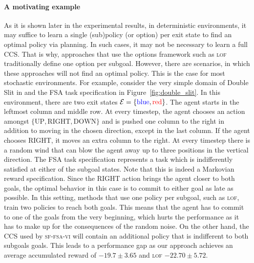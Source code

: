 \paragraph{A motivating example} As it is shown later in the experimental results, in deterministic environments, it may suffice to learn a single (sub)policy (or option) per exit state to find an optimal policy via planning. In such cases, it may not be necessary to learn a full CCS. That is why, approaches that use the options framework such as \textsc{lof} traditionally define one option per subgoal. However, there are scenarios, in which these approaches will not find an optimal policy. This is the case for most stochastic environments. For example, consider the very simple domain of Double Slit in and the FSA task specification in Figure~\ref{fig:double_slit}. In this environment, there are two exit states $\mathcal{E}=\{{\color{blue} \text{blue}}, {\color{red}\text{red}}\}$. The agent starts in the leftmost column and middle row. At every timestep, the agent chooses an action amongst $\{\text{UP}, \text{RIGHT}, \text{DOWN}\}$ and is pushed one column to the right in addition to moving in the chosen direction, except in the last column. If the agent chooses RIGHT, it moves an extra column to the right. At every timestep there is a random wind that can blow the agent away up to three positions in the vertical direction. The FSA task specification represents a task which is indifferently satisfied at either of the subgoal states. Note that this is indeed a Markovian reward specification. Since the RIGHT action brings the agent closer to both goals, the optimal behavior in this case is to commit to either goal as late as possible. In this setting, methods that use one policy per subgoal, such as \textsc{lof}, train two policies to reach both goals. This means that the agent has to commit to one of the goals from the very beginning, which hurts the performance as it has to make up for the consequences of the random noise. On the other hand, the CCS used by \textsc{sf-fsa-vi} will contain an additional policy that is indifferent to both subgoals goals. This leads to a performance gap as our approach achieves an average accumulated reward of $-19.7\pm3.65$ and \textsc{lof} $-22.70\pm 5.72$.


